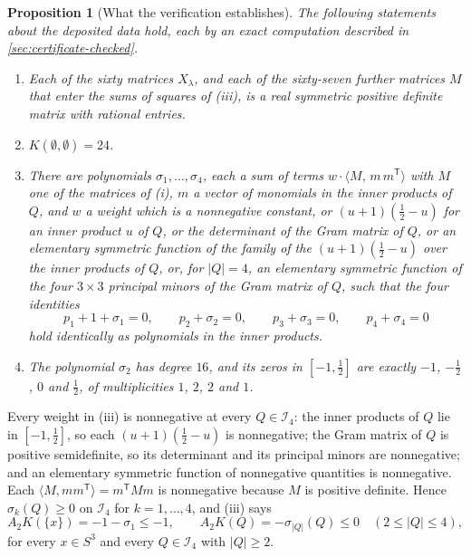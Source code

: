 \documentclass[11pt,reqno]{amsart}
\renewcommand{\_}{\origunderscore\allowbreak}
\numberwithin{equation}{section}
\theoremstyle{plain}
\newtheorem{prop}[thm]{Proposition}
\theoremstyle{definition}
\theoremstyle{remark}
\begin{document}
\begin{prop}[What the verification establishes]\label{prop:verified}
The following statements about the deposited data hold, each by an exact
computation described in \cref{sec:certificate-checked}.
\begin{enumerate}[label=\textup{(\roman*)},leftmargin=2.6em,itemsep=0.12em]
\item Each of the sixty matrices $X_\lambda$, and each of the sixty-seven
      further matrices $M$ that enter the sums of squares of
      \textup{(iii)}, is a real symmetric positive definite matrix with
      rational entries.
\item $K(\emptyset,\emptyset)=24$.
\item There are polynomials $\sigma_1,\dots,\sigma_4$, each a sum of terms
      $w\cdot\langle M,\,m\,m^{\mathsf T}\rangle$ with $M$ one of the
      matrices of \textup{(i)}, $m$ a vector of monomials in the inner
      products of $Q$, and $w$ a weight which is a nonnegative constant, or
      $(u+1)(\tfrac12-u)$ for an inner product $u$ of $Q$, or the
      determinant of the Gram matrix of $Q$, or an elementary symmetric
      function of the family of the $(u+1)(\tfrac12-u)$ over the inner
      products of $Q$, or, for $|Q|=4$, an elementary symmetric function
      of the four $3\times3$ principal minors of the Gram matrix of $Q$,
      such that the four identities
      \[
        p_1+1+\sigma_1=0,\qquad p_2+\sigma_2=0,\qquad p_3+\sigma_3=0,\qquad p_4+\sigma_4=0
      \]
      hold identically as polynomials in the inner products.
\item The polynomial $\sigma_2$ has degree $16$, and its zeros in
      $[-1,\tfrac12]$ are exactly $-1$, $-\tfrac12$, $0$ and $\tfrac12$, of
      multiplicities $1$, $2$, $2$ and $1$.
\end{enumerate}
\end{prop}

Every weight in (iii) is nonnegative at every $Q\in\mathcal I_4$: the
inner products of $Q$ lie in $[-1,\tfrac12]$, so each $(u+1)(\tfrac12-u)$
is nonnegative; the Gram matrix of $Q$ is positive semidefinite, so its
determinant and its principal minors are nonnegative; and an elementary
symmetric function of nonnegative quantities is nonnegative. Each
$\langle M,mm^{\mathsf T}\rangle=m^{\mathsf T}Mm$ is nonnegative because
$M$ is positive definite. Hence $\sigma_k(Q)\ge0$ on $\mathcal I_4$ for
$k=1,\dots,4$, and (iii) says
\begin{equation}\label{eq:constraints-hold}
  A_2K(\{x\})=-1-\sigma_1\le-1,\qquad A_2K(Q)=-\sigma_{|Q|}(Q)\le0\quad(2\le|Q|\le4),
\end{equation}
for every $x\in S^3$ and every $Q\in\mathcal I_4$ with $|Q|\ge2$.
\end{document}
